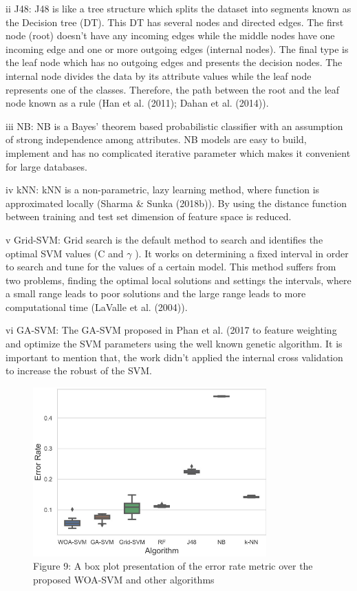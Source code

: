 \documentclass{article}
\begin{document}
ii J48: J48 is like a tree structure which splits the dataset into segments known as the Decision tree (DT). This DT has several nodes and directed edges. The first node (root) doesn’t have any incoming edges while the middle nodes have one incoming edge and one or more outgoing edges (internal nodes). The final type is the leaf node which has no outgoing edges and presents the decision nodes. The internal node divides the data by its attribute values while the leaf node represents one of the classes. Therefore, the path between the root and the leaf node known as a rule (Han et al. (2011); Dahan et al. (2014)).


iii NB: NB is a Bayes’ theorem based probabilistic classifier with an assumption of strong independence among attributes. NB models are easy to build, implement and has no complicated iterative parameter which makes it convenient for large databases.


iv kNN: kNN is a non-parametric, lazy learning method, where function is approximated locally (Sharma & Sunka (2018b)). By using the distance function between training and test set dimension of feature space is reduced.


v Grid-SVM: Grid search is the default method to search and identifies the optimal SVM values (C and $\gamma$ ). It works on determining a fixed interval in order to search and tune for the values of a certain model. This method suffers from two problems, finding the optimal local solutions and settings the intervals, where a small range leads to poor solutions and the large range leads to more computational time (LaValle et al. (2004)).


vi GA-SVM: The GA-SVM proposed in Phan et al. (2017 to feature weighting and optimize the SVM parameters using the well known genetic algorithm. It is important to mention that, the work didn’t applied the internal cross validation to increase the robust of the SVM.


\begin{figure}[htbp]
\centering
\includegraphics[width=0.8\textwidth]{images/691e3e4fd28e868d09ef54655323bc7e12274adaf194f1246ad306f060ab0f92.jpg}
\caption{Figure 9: A box plot presentation of the error rate metric over the proposed WOA-SVM and other algorithms}
\end{figure}
\end{document}
